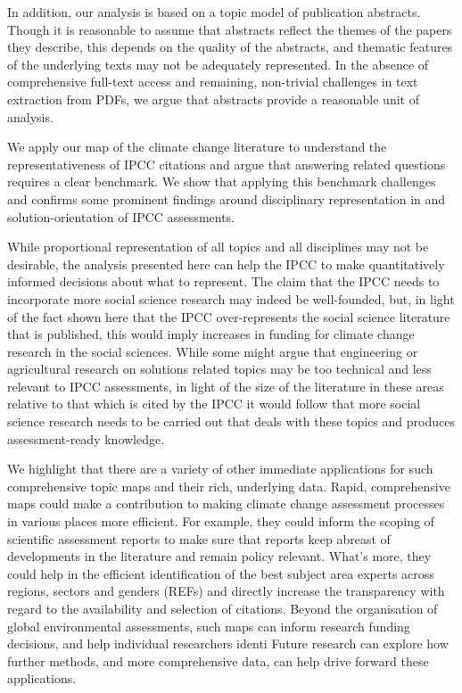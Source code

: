 \documentclass{article}
\begin{document}
\begin{linenumbers}
		In addition, our analysis is based on a topic model of publication abstracts. Though it is reasonable to assume that abstracts reflect the themes of the papers they describe, this depends on the quality of the abstracts, and thematic features of the underlying texts may not be adequately represented.  In the absence of comprehensive full-text access and remaining, non-trivial challenges in text extraction from PDFs, we argue that abstracts provide a reasonable unit of analysis.
		
		We apply our map of the climate change literature to understand the representativeness of IPCC citations and argue that answering related questions requires a clear benchmark. We show that applying this benchmark challenges and confirms some prominent findings around disciplinary representation in and solution-orientation of IPCC assessments. 
		
		While proportional representation of all topics and all disciplines may not be desirable, the analysis presented here can help the IPCC to make quantitatively informed decisions about what to represent. The claim that the IPCC needs to incorporate more social science research may indeed be well-founded, but, in light of the fact shown here that the IPCC over-represents the social science literature that is published, this would imply increases in funding for climate change research in the social sciences. While some might argue that engineering or agricultural research on solutions related topics may be too technical and less relevant to IPCC assessments, in light of the size of the literature in these areas relative to that which is cited by the IPCC it would follow that more social science research needs to be carried out that deals with these topics and produces assessment-ready knowledge.
		
		
		We highlight that there are a variety of other immediate applications for such comprehensive topic maps and their rich, underlying data. Rapid, comprehensive maps could make a contribution to making climate change assessment processes in various places more efficient. For example, they could inform the scoping of scientific assessment reports to make sure that reports keep abreast of developments in the literature and remain policy relevant. What's more, they could help in the efficient identification of the best subject area experts across regions, sectors and genders (REFs) and directly increase the transparency with regard to the availability and selection of citations. Beyond the organisation of global environmental assessments, such maps can inform research funding decisions, and help individual researchers identi Future research can explore how further methods, and more comprehensive data, can help drive forward these applications.
		

\end{linenumbers}
\end{document}
